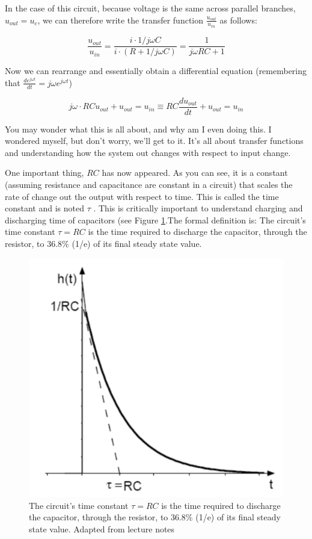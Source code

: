 In the case of this circuit, because voltage is the same across parallel branches, $u_{out} = u_c$, we can therefore write the transfer function $\frac{u_{out}}{u_{in}}$ as follows: 

\begin{equation}
    \frac{u_{out}}{u_{in}} = \frac{i \cdot 1/j \omega C}{i \cdot (R + 1/j \omega C)} = \frac{1}{j \omega RC + 1}
\end{equation}

Now we can rearrange and essentially obtain a differential equation (remembering that $\frac{de^{j\omega t}}{dt} = j \omega e^{j\omega t}$)

\begin{equation}
    j \omega \cdot RC u_{out} + u_{out} = u_{in} \equiv RC\frac{du_{out}}{dt} + u_{out} = u_{in}
\end{equation}

You may wonder what this is all about, and why am I even doing this. I wondered myself, but don't worry, we'll get to it. It's all about transfer functions and understanding how the system out changes with respect to input change.

One important thing, $RC$ has now appeared. As you can see, it is a constant (assuming resistance and capacitance are constant in a circuit) that scales the rate of change out the output with respect to time. This is called the time constant and is noted $\tau$ . This is critically important to understand charging and discharging time of capacitors (see Figure \ref{fig:Time_Constant}.The formal definition is: The circuit's time constant $\tau = RC$ is the time required to discharge the capacitor, through the resistor, to 36.8\% (1/e) of its final steady state value.

\begin{figure}[H]
    \centering
    \includegraphics[width=0.4\linewidth]{../../Figures/RC_Time_Constant.PNG}
    \caption{The circuit's time constant $\tau = RC$ is the time required to discharge the capacitor, through the resistor, to 36.8\% (1/e) of its final steady state value. Adapted from lecture notes}
    \label{fig:Time_Constant}
\end{figure}



